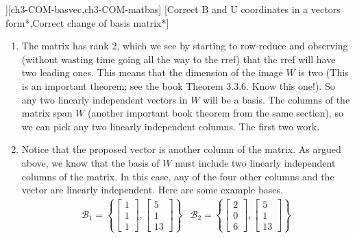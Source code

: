 \begin{SaveQuestion}
{\begin{enumerate}
        \end{enumerate} }
][ch3-COM-basvec,ch3-COM-matbas] %
    [Correct B and U coordinates in a vectors form*,Correct change of basis matrix*]    %
     \begin{enumerate}
         \item The matrix has rank 2, which we see by starting to row-reduce and observing (without wasting time going all the way to the rref) that the rref will have two leading ones. This means that the dimension of the image $W$ is two (This is an important theorem; see the book Theorem 3.3.6. Know this one!). So any two linearly independent vectors in $W$ will be a basis. The columns of the matrix span $W$ (another important book theorem from the same section), so we can pick any two linearly independent columns. The first two work.
         \item Notice that the proposed vector is another column of the matrix. As argued above, we know that the basis of $W$ must include two linearly independent columns of the matrix. In this case, any of the four other columns and the vector are linearly independent. Here are some example bases.
         $$\begin{array}{ll}
             \mathcal B_1 = \left\{\begin{bmatrix} 1 \\ 1 \\ 1 \end{bmatrix},\begin{bmatrix} 5 \\ 1 \\ 13 \end{bmatrix}\right\} & \mathcal B_2 = \left\{\begin{bmatrix} 2 \\ 0 \\ 6 \end{bmatrix},\begin{bmatrix} 5 \\ 1 \\ 13 \end{bmatrix}\right\} \\ \\

\end{array}$$
\end{enumerate}
\end{SaveQuestion}
